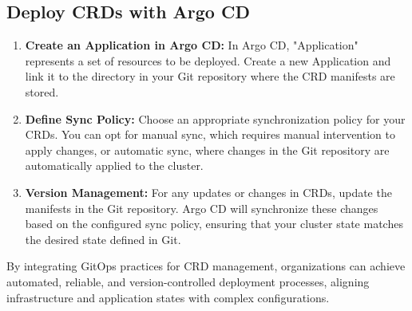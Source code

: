\subsection{Deploy \ac{CRD}s with Argo CD}

\begin{enumerate}
    \item \textbf{Create an Application in Argo CD:} In Argo CD, "Application" represents a set of resources to be deployed. Create a new Application and link it to the directory in your Git repository where the \ac{CRD} manifests are stored. 
    \item \textbf{Define Sync Policy:} Choose an appropriate synchronization policy for your \ac{CRD}s. You can opt for manual sync, which requires manual intervention to apply changes, or automatic sync, where changes in the Git repository are automatically applied to the cluster. 
    \item \textbf{Version Management:} For any updates or changes in \ac{CRD}s, update the manifests in the Git repository. Argo CD will synchronize these changes based on the configured sync policy, ensuring that your cluster state matches the desired state defined in Git. 
\end{enumerate}

By integrating GitOps practices for \ac{CRD} management, organizations can achieve automated, reliable, and version-controlled deployment processes, aligning infrastructure and application states with complex configurations.